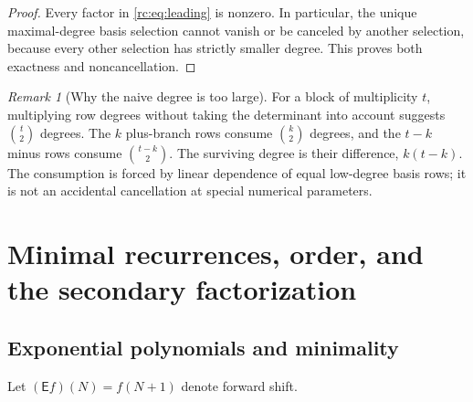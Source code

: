 \documentclass[11pt,a4paper]{article}
\numberwithin{equation}{section}
\theoremstyle{definition}
\theoremstyle{remark}
\newtheorem{remark}[theorem]{Remark}
\newcommand{\E}{\mathsf E}
\begin{document}
\begin{proof}
Every factor in \eqref{rc:eq:leading} is nonzero.  In particular, the
unique maximal-degree basis selection cannot vanish or be canceled by
another selection, because every other selection has strictly smaller
degree.  This proves both exactness and noncancellation.
\end{proof}

\begin{remark}[Why the naive degree is too large]
For a block of multiplicity $t$, multiplying row degrees without taking
the determinant into account suggests $\binom t2$ degrees.  The
$k$ plus-branch rows consume $\binom k2$ degrees, and the $t-k$ minus
rows consume $\binom{t-k}2$.  The surviving degree is their difference,
$k(t-k)$.  The consumption is forced by linear dependence of equal
low-degree basis rows; it is not an accidental cancellation at special
numerical parameters.
\end{remark}

\section{Minimal recurrences, order, and the secondary factorization}
\label{rc:sec:recurrences}

\subsection{Exponential polynomials and minimality}
Let $(\E f)(N)=f(N+1)$ denote forward shift.
\end{document}
